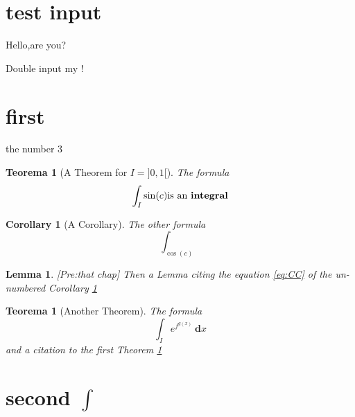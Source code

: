 \documentclass[a4paper]{article}
\def\nr{4}
\def\nr_b{3}
\newcounter{myCount}
\newtheorem{Theorem}%
[myCount]{Teorema}
\newtheorem*{Cor}%
{Corollary}
\newtheorem{Lem}%
{Lemma}
\newcommand\prerequisites[1]{{[Pre:#1]}}
\begin{document}
\section{test input}
%
Hello,are you?

Double input my !

\section{first}%
the number \nr_b

\begin{Theorem}[A  Theorem for {$I=]0,1[$}]\label{CT}
  The formula
\[ \int_I {\sin(c)} \hbox{is an \textbf{integral}}\]
\end{Theorem}

\begin{Cor}[A Corollary]\label{CC}
  The other formula
  \begin{equation}%
    \label{eq:CC}
    \int_{\cos(c)}
  \end{equation}
\end{Cor}
\begin{Lem}\label{lem:2}
  \prerequisites {\emph{that chap}}
  Then a Lemma citing the equation \ref{eq:CC} of the un-numbered Corollary \ref{CC}
\end{Lem}

\begin{Theorem}[Another Theorem]
  The formula
  \[ \int_I{e^{f^{g(x)}}} \ \textbf{d}x \]
  and a citation to the first Theorem \ref{CT}
\end{Theorem}

\section*{second $\int$}
\end{document}
